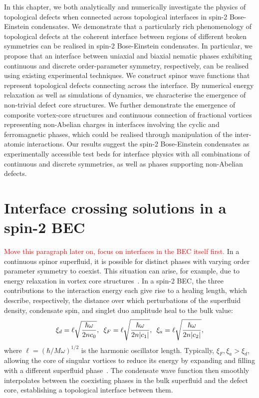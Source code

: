 In this chapter, we both analytically and numerically investigate the physics
of topological defects when connected across topological interfaces in spin-2
Bose-Einstein condensates.
We demonstrate that a particularly rich phenomenology of topological defects
at the coherent
interface between regions of different broken symmetries can be realised in
spin-2 Bose-Einstein condensates.
In particular, we propose that an interface between uniaxial and biaxial nematic
phases exhibiting continuous and discrete order-parameter symmetry,
respectively, can be realised using existing experimental techniques.
We construct spinor wave functions that represent topological defects connecting
across the interface.
By numerical energy relaxation as well as simulations of dynamics, we
characterise the emergence of non-trivial defect core structures.
We further demonstrate the emergence of composite vortex-core structures and
continuous connection of fractional vortices representing non-Abelian charges in
interfaces involving the cyclic and ferromagnetic phases, which could be
realised through manipulation of the inter-atomic interactions.
Our results suggest the spin-2 Bose-Einstein condensates as experimentally
accessible test beds for interface physics with all combinations of continuous
and discrete symmetries, as well as phases supporting non-Abelian defects.

\section{Interface crossing solutions in a spin-2 BEC}
\textcolor{red}{Move this paragraph later on, focus on interfaces in the BEC
itself first.}
In a continuous spinor superfluid, it is possible for distinct phases with
varying order parameter symmetry to coexist.
This situation can arise, for example, due to energy relaxation in vortex core
structures~\cite{Ruostekoski2003,Lovegrove2012,Lovegrove2016,Borgh2016,
    Borgh2016a, Weiss2019,Xiao2021,Xiao2022}.
In a spin-2 BEC, the three contributions to the interaction energy each give
rise to a healing length, which describe, respectively, the distance over which
perturbations of the superfluid density, condensate spin, and singlet duo
amplitude heal to the bulk value:
\begin{equation}
    \xi_d=\ell \sqrt{\frac{\hbar\omega}{2nc_0}},
    \enskip \xi_F=\ell \sqrt{\frac{\hbar\omega}{2n|c_1|}},
    \enskip \xi_a=\ell \sqrt{\frac{\hbar\omega}{2n|c_2|}},
    \label{eq: spin-2-healing-lengths}
\end{equation}
where \(\ell = {(\hbar/M\omega)}^{1/2}\) is the harmonic oscillator length.
Typically, \(\xi_F,\xi_a > \xi_d\), allowing the core of singular vortices
to reduce its energy by expanding and filling with a different superfluid
phase~\cite{Ruostekoski2003}.
The condensate wave function then smoothly interpolates between the coexisting
phases in the bulk superfluid and the defect core, establishing a topological
interface between them.

